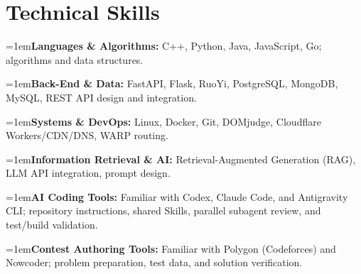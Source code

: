 \documentclass[10pt,a4paper]{article}
\newcommand{\skillrow}[2]{%
  \par\noindent\hangindent=1em\hangafter=1\textbf{#1} #2\par
}
\begin{document}
\section{Technical Skills}
\skillrow{Languages \& Algorithms:}{C++, Python, Java, JavaScript, Go; algorithms and data structures.}
\skillrow{Back-End \& Data:}{FastAPI, Flask, RuoYi, PostgreSQL, MongoDB, MySQL, REST API design and integration.}
\skillrow{Systems \& DevOps:}{Linux, Docker, Git, DOMjudge, Cloudflare Workers/CDN/DNS, WARP routing.}
\skillrow{Information Retrieval \& AI:}{Retrieval-Augmented Generation (RAG), LLM API integration, prompt design.}
\skillrow{AI Coding Tools:}{Familiar with Codex, Claude Code, and Antigravity CLI; repository instructions, shared Skills, parallel subagent review, and test/build validation.}
\skillrow{Contest Authoring Tools:}{Familiar with Polygon (Codeforces) and Nowcoder; problem preparation, test data, and solution verification.}
\end{document}
